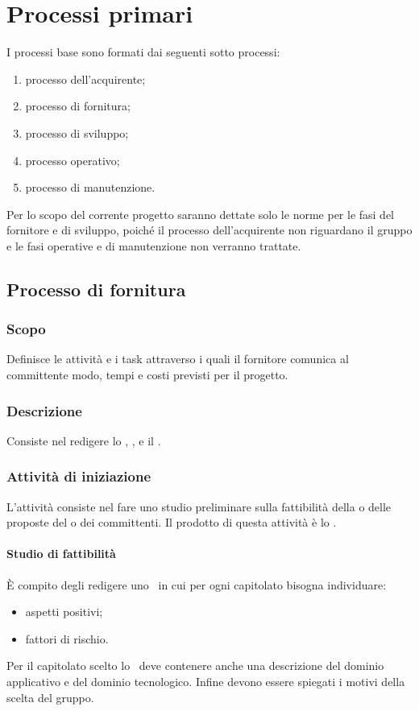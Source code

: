 \documentclass[12pt,a4paper]{article}
\begin{document}
\newpage

\section{Processi primari}
I processi base sono formati dai seguenti sotto processi:
\begin{enumerate}
\item processo dell'acquirente;
\item processo di fornitura;
\item processo di sviluppo;
\item processo operativo;
\item processo di manutenzione.
\end{enumerate}
Per lo scopo del corrente progetto saranno dettate solo le norme per le fasi del fornitore e di sviluppo, poiché il processo dell'acquirente non riguardano il gruppo e le fasi operative e di manutenzione non verranno trattate.

\subsection{Processo di fornitura}

\subsubsection{Scopo}
Definisce le attività e i task attraverso i quali il fornitore comunica al committente modo, tempi e costi previsti per il progetto.

\subsubsection{Descrizione}
Consiste nel redigere lo \SdF, \PdQ, e il \PdP.

\subsubsection{Attività di iniziazione}
L'attività consiste nel fare uno studio preliminare sulla fattibilità della o delle proposte del o dei committenti. Il prodotto di questa attività è lo \SdF.

\paragraph{Studio di fattibilità}
È compito degli \ANpl{} redigere uno \SdF\ in cui per ogni capitolato bisogna individuare:
\begin{itemize}
	\item aspetti positivi;
	\item fattori di rischio.
\end{itemize}
Per il capitolato scelto lo \SdF\ deve contenere anche una descrizione del dominio applicativo e del dominio tecnologico. Infine devono essere spiegati i motivi della scelta del gruppo.
\end{document}
